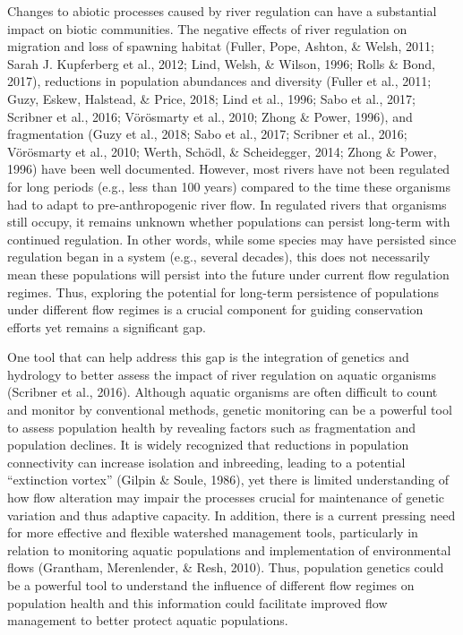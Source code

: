 \documentclass[twoside,12pt,final]{ucthesis-CA2012}
\begin{document}
\begin{ucmainmatter}
Changes to abiotic processes caused by river regulation can have a
substantial impact on biotic communities. The negative effects of river
regulation on migration and loss of spawning habitat (Fuller, Pope,
Ashton, \& Welsh, 2011; Sarah J. Kupferberg et al., 2012; Lind, Welsh,
\& Wilson, 1996; Rolls \& Bond, 2017), reductions in population
abundances and diversity (Fuller et al., 2011; Guzy, Eskew, Halstead, \&
Price, 2018; Lind et al., 1996; Sabo et al., 2017; Scribner et al.,
2016; Vörösmarty et al., 2010; Zhong \& Power, 1996), and fragmentation
(Guzy et al., 2018; Sabo et al., 2017; Scribner et al., 2016; Vörösmarty
et al., 2010; Werth, Schödl, \& Scheidegger, 2014; Zhong \& Power, 1996)
have been well documented. However, most rivers have not been regulated
for long periods (e.g., less than 100 years) compared to the time these
organisms had to adapt to pre-anthropogenic river flow. In regulated
rivers that organisms still occupy, it remains unknown whether
populations can persist long-term with continued regulation. In other
words, while some species may have persisted since regulation began in a
system (e.g., several decades), this does not necessarily mean these
populations will persist into the future under current flow regulation
regimes. Thus, exploring the potential for long-term persistence of
populations under different flow regimes is a crucial component for
guiding conservation efforts yet remains a significant gap.

One tool that can help address this gap is the integration of genetics
and hydrology to better assess the impact of river regulation on aquatic
organisms (Scribner et al., 2016). Although aquatic organisms are often
difficult to count and monitor by conventional methods, genetic
monitoring can be a powerful tool to assess population health by
revealing factors such as fragmentation and population declines. It is
widely recognized that reductions in population connectivity can
increase isolation and inbreeding, leading to a potential ``extinction
vortex'' (Gilpin \& Soule, 1986), yet there is limited understanding of
how flow alteration may impair the processes crucial for maintenance of
genetic variation and thus adaptive capacity. In addition, there is a
current pressing need for more effective and flexible watershed
management tools, particularly in relation to monitoring aquatic
populations and implementation of environmental flows (Grantham,
Merenlender, \& Resh, 2010). Thus, population genetics could be a
powerful tool to understand the influence of different flow regimes on
population health and this information could facilitate improved flow
management to better protect aquatic populations.


\end{ucmainmatter}
\end{document}
